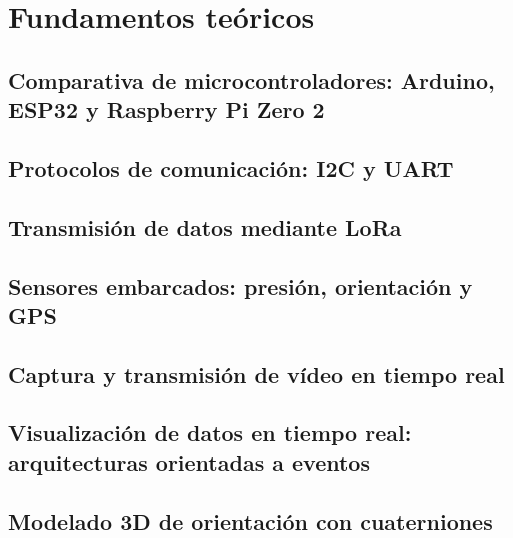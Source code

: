 \chapter{Fundamentos teóricos}
\label{cap:fundamentos_teoricos}
\section{Comparativa de microcontroladores: Arduino, ESP32 y Raspberry Pi Zero 2}
\section{Protocolos de comunicación: I2C y UART}
\section{Transmisión de datos mediante LoRa}
\section{Sensores embarcados: presión, orientación y GPS}
\section{Captura y transmisión de vídeo en tiempo real}
\section{Visualización de datos en tiempo real: arquitecturas orientadas a eventos}
\section{Modelado 3D de orientación con cuaterniones}
